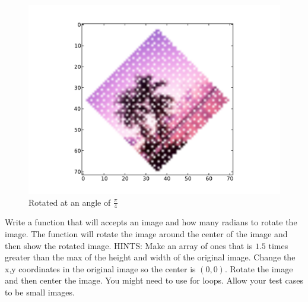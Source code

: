 \begin{figure}[H]
\includegraphics[scale = .5]{rotateimg.pdf}
\caption{Rotated at an angle of $\frac{\pi}{4}$}
\end{figure}

\begin{problem}
Write a function that will accepts an image and how many radians to rotate the image. The function will rotate the image around the center of the image and then show the rotated image. HINTS: Make an array of ones that is $1.5$ times greater than the max of the height and width of the original image. Change the x,y coordinates in the original image so the center is $(0,0)$. Rotate the image and then center the image. You might need to use for loops. Allow your test cases to be small images.
\end{problem}


